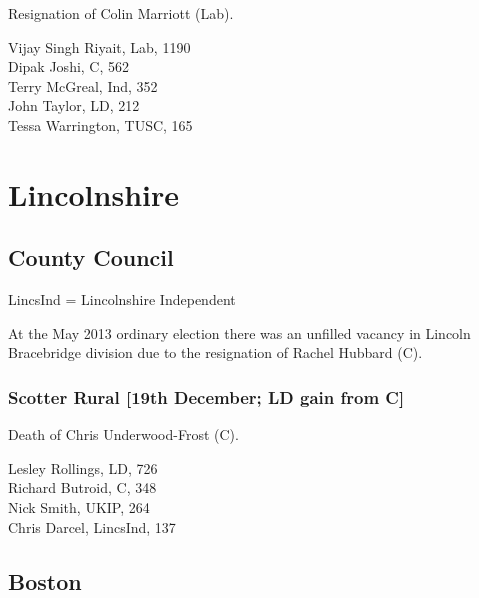 \documentclass[a4paper,openany,10pt]{book}
\begin{document}

Resignation of Colin Marriott (Lab).



Vijay Singh Riyait, Lab, 1190\\
Dipak Joshi, C, 562\\
Terry McGreal, Ind, 352\\
John Taylor, LD, 212\\
Tessa Warrington, TUSC, 165\\


\vfill

\section{Lincolnshire}

\subsection*{County Council}

LincsInd = Lincolnshire Independent

At the May 2013 ordinary election there was an unfilled vacancy in Lincoln Bracebridge division due to the resignation of Rachel Hubbard (C).

\subsubsection*{Scotter Rural \hspace*{\fill}\nolinebreak[1]%
\enspace\hspace*{\fill}
[19th December; LD gain from C]}


Death of Chris Underwood-Frost (C).



Lesley Rollings, LD, 726\\
Richard Butroid, C, 348\\
Nick Smith, UKIP, 264\\
Chris Darcel, LincsInd, 137\\



\subsection*{Boston}
\end{document}
